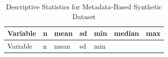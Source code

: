 \documentclass[
  letterpaper,
  DIV=11,
  numbers=noendperiod]{scrartcl}
\begin{document}
\begin{longtable}[]{@{}
  >{\raggedright\arraybackslash}p{}
  >{\raggedleft\arraybackslash}p{}
  >{\raggedleft\arraybackslash}p{}
  >{\raggedleft\arraybackslash}p{}
  >{\raggedleft\arraybackslash}p{}
  >{\raggedleft\arraybackslash}p{}
  >{\raggedleft\arraybackslash}p{}@{}}
\caption{Descriptive Statistics for Metadata-Based Synthetic
Dataset}\tabularnewline
\toprule\noalign{}
\begin{minipage}[b]{\linewidth}\raggedright
Variable
\end{minipage} & \begin{minipage}[b]{\linewidth}\raggedleft
n
\end{minipage} & \begin{minipage}[b]{\linewidth}\raggedleft
mean
\end{minipage} & \begin{minipage}[b]{\linewidth}\raggedleft
sd
\end{minipage} & \begin{minipage}[b]{\linewidth}\raggedleft
min
\end{minipage} & \begin{minipage}[b]{\linewidth}\raggedleft
median
\end{minipage} & \begin{minipage}[b]{\linewidth}\raggedleft
max
\end{minipage} \\
\midrule\noalign{}
\endfirsthead
\toprule\noalign{}
\begin{minipage}[b]{\linewidth}\raggedright
Variable
\end{minipage} & \begin{minipage}[b]{\linewidth}\raggedleft
n
\end{minipage} & \begin{minipage}[b]{\linewidth}\raggedleft
mean
\end{minipage} & \begin{minipage}[b]{\linewidth}\raggedleft
sd
\end{minipage} & \begin{minipage}[b]{\linewidth}\raggedleft
min
\end{minipage} & \begin{minipage}[b]{\linewidth}\raggedleft

\end{minipage}
\end{longtable}
\end{document}
